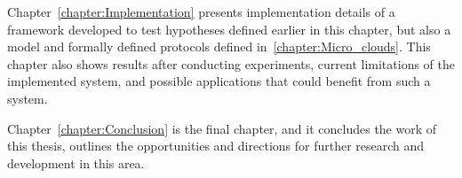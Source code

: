 Chapter~\ref{chapter:Implementation} presents implementation details of a framework developed to test hypotheses defined earlier in this chapter, but also a model and formally defined protocols defined in~\ref{chapter:Micro_clouds}. This chapter also shows results after conducting experiments, current limitations of the implemented system, and possible applications that could benefit from such a system.

Chapter~\ref{chapter:Conclusion} is the final chapter, and it concludes the work of this thesis, outlines the opportunities and directions for further research and development in this area.
%
%